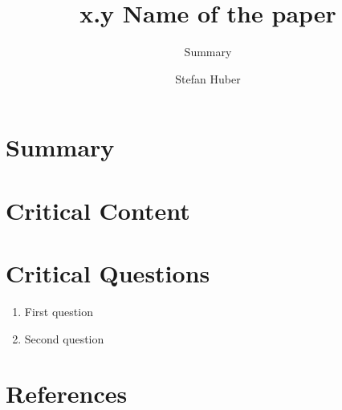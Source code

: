 \documentclass[oneside, notitlepage, twocolumn]{scrartcl}
\title{\LARGE x.y Name of the paper}
\subtitle{Summary}
\author{Stefan Huber}
\begin{document}
\maketitle

\section{Summary}

\section{Critical Content}

\section{Critical Questions}
\begin{enumerate}
    \item First question
    \item Second question
\end{enumerate}

\section{References}
\begingroup
\renewcommand{\section}[2]{}%
\nocite{*}
\printbibliography%
\endgroup
\end{document}
